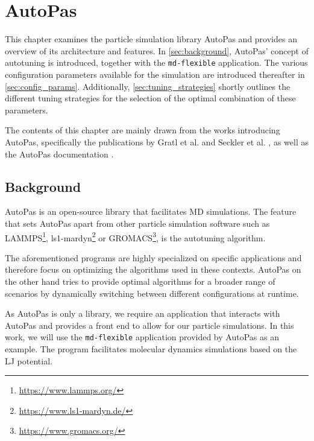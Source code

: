 \chapter[AutoPas]{AutoPas}
\label{cp:autopas}

{
	\parindent0pt
	This chapter examines the particle simulation library AutoPas and provides an overview of its architecture and features. In \autoref{sec:background}, AutoPas' concept of autotuning is introduced, together with the \texttt{md-flexible} application. %
	The various configuration parameters available for the simulation are introduced thereafter in \autoref{sec:config_params}. Additionally, \autoref{sec:tuning_strategies} shortly outlines the different tuning strategies for the selection of the optimal combination of these parameters.

	The contents of this chapter are mainly drawn from the works introducing AutoPas, specifically the publications by Gratl et al. \cite{Gratl2019, Gratl2021, GratlGassner2025} and Seckler et al. \cite{Seckler2021}, as well as the AutoPas documentation \cite{AutoPas2025}.
}


\section{Background}
\label{sec:background}
AutoPas is an open-source \CC{} library that facilitates MD simulations. The feature that sets AutoPas apart from other particle simulation software such as LAMMPS\footnote{\href{https://www.lammps.org/}{https://www.lammps.org/}}, ls1-mardyn\footnote{\href{https://www.ls1-mardyn.de/}{https://www.ls1-mardyn.de/}} or GROMACS\footnote{\href{https://www.gromacs.org/}{https://www.gromacs.org/}}, is the autotuning algorithm.

The aforementioned programs are highly specialized on specific applications and therefore focus on optimizing the algorithms used in these contexts.
AutoPas on the other hand tries to provide optimal algorithms for a broader range of scenarios by dynamically switching between different configurations at runtime.

As AutoPas is only a library, we require an application that interacts with AutoPas and provides a front end to allow for our particle simulations. In this work, we will use the \texttt{md-flexible} application provided by AutoPas as an example. The program facilitates molecular dynamics simulations based on the LJ potential.


